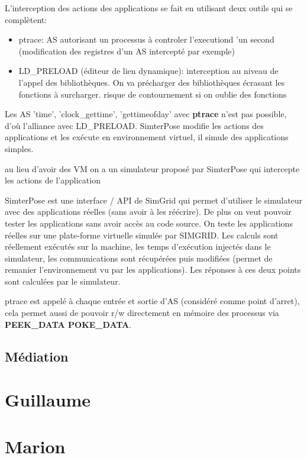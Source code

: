 \documentclass{article}
\begin{document}
L'interception des actions des applications se fait en utilisant deux outils qui se complètent:
\begin{itemize}
\item ptrace: AS autorisant un processus à controler l'executiond 'un second (modification des registres d'un AS intercepté par exemple)
\item LD\_PRELOAD (éditeur de lien dynamique): interception au niveau de l'appel des bibliothèques. On va précharger des bibliothèques écrasant les fonctions à surcharger. {\color{red} risque de contournement si on oublie des fonctions}
\end{itemize}

Les AS 'time', 'clock\_gettime', 'gettimeofday' avec \textbf{ptrace} n'est pas possible, d'où l'alliance avec LD\_PRELOAD.
SimterPose modifie les actions des applications et les exécute en environnement virtuel, il simule des applications simples.

{\color{green} au lieu d'avoir des VM on a un simulateur proposé par SimterPose qui intercepte les actions de l'application}

SimterPose est une interface / API de SimGrid qui permet d'utiliser le simulateur avec des applications réelles (sans avoir à les réécrire). De plus on veut pouvoir tester les applications sans avoir accès au code source. On teste les applications réelles sur une plate-forme virtuelle simulée par SIMGRID. Les calculs sont réellement exécutés sur la machine, les temps d'exécution injectés dans le simulateur, les communications sont récupérées puis modifiées (permet de remanier l'environnement vu par les applications). Les réponses à ces deux points sont calculées par le simulateur.

ptrace est appelé à chaque entrée et sortie d'AS (considéré comme point d'arret), cela permet aussi de pouvoir r/w directement en mémoire des processus via \textbf{PEEK\_DATA POKE\_DATA}.

\subsection{Médiation}

\section{Guillaume}

\section{Marion}
\end{document}
